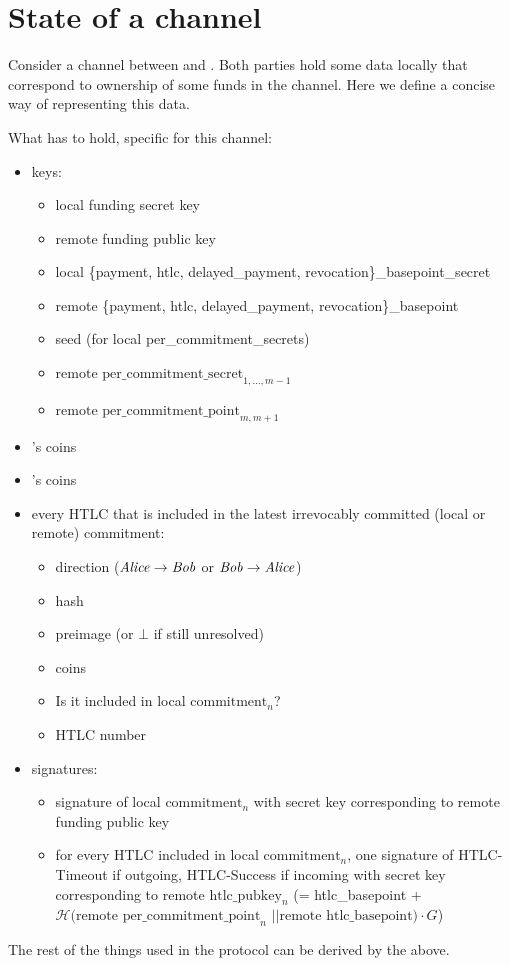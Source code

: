 \section{State of a channel}
  Consider a channel between \alice{} and \bob. Both parties hold some data
  locally that correspond to ownership of some funds in the channel. Here we
  define a concise way of representing this data.

  What \alice{} has to hold, specific for this channel:
  \begin{itemize}
    \item keys:
    \begin{itemize}
      \item local funding secret key
      \item remote funding public key
      \item local \{payment, htlc, delayed\_payment,
      revocation\}\_basepoint\_secret
      \item remote \{payment, htlc, delayed\_payment, revocation\}\_basepoint
      \item seed (for local per\_commitment\_secrets)
      \item $\text{remote per\_commitment\_secret}_{1, \dots, m-1}$
      \item $\text{remote per\_commitment\_point}_{m, m+1}$
    \end{itemize}
    \item \alice's coins
    \item \bob's coins
    \item every HTLC that is included in the latest irrevocably committed (local
    or remote) commitment:
      \begin{itemize}
        \item direction ($\mathit{Alice} \rightarrow \mathit{Bob}$ or $\mathit{Bob} \rightarrow \mathit{Alice}$)
        \item hash
        \item preimage (or $\bot$ if still unresolved)
        \item coins
        \item Is it included in local $\mathrm{commitment}_n$?
        \item HTLC number
      \end{itemize}
    \item signatures:
    \begin{itemize}
      \item signature of local $\mathrm{commitment}_n$ with secret key
      corresponding to remote funding public key
      \item for every HTLC included in local $\mathrm{commitment}_n$, one
      signature of HTLC-Timeout if outgoing, HTLC-Success if incoming with
      secret key corresponding to remote $\mathrm{htlc\_pubkey}_n$ (=
      htlc\_basepoint + $\mathcal{H}(\text{remote per\_commitment\_point}_n$ $||
      \text{remote htlc\_basepoint}) \cdot G$)
    \end{itemize}
  \end{itemize}
  The rest of the things used in the protocol can be derived by the above.

